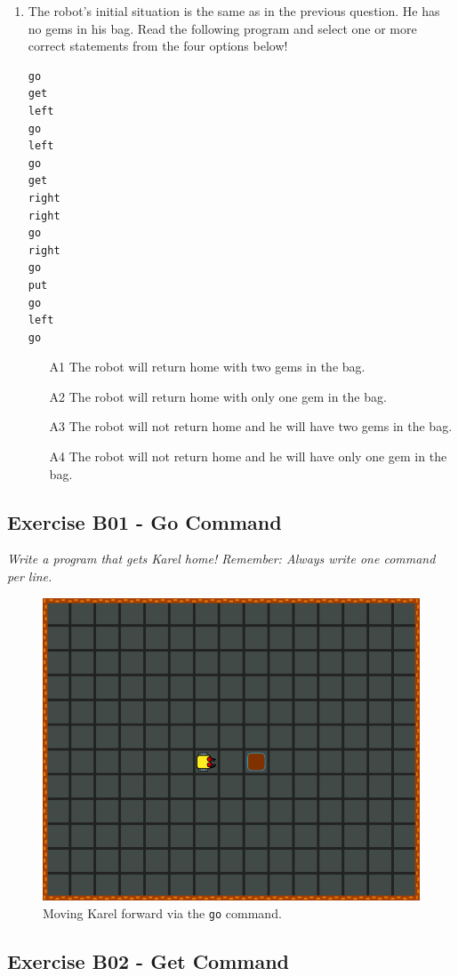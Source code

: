 \begin{enumerate}
\begin{enumerate}
\end{enumerate}
\item The robot's initial situation is the same as in the previous question. He has no gems 
in his bag. Read the following program and select one or more correct statements from the four options below!
\begin{verbatim}
go
get
left
go
left
go
get
right
right
go
right
go
put
go
left 
go
\end{verbatim}
\begin{enumerate}
\item[A1] The robot will return home with two gems in the bag.
\item[A2] The robot will return home with only one gem in the bag.
\item[A3] The robot will not return home and he will have two gems in the bag.
\item[A4] The robot will not return home and he will have only one gem in the bag.
\end{enumerate}
\end{enumerate}


\newpage
\subsection{Exercise B01 - Go Command}

{\em Write a program that gets Karel home! Remember: Always write one command per line.}

\begin{figure}[!ht]
\begin{center}
\includegraphics[height=0.4\textwidth]{imgk/b01.png}
\end{center}
\vspace{-4mm}
\caption{Moving Karel forward via the {\tt go} command.}
\label{fig:b01}
\vspace{-4mm}
\end{figure}
\noindent

\subsection{Exercise B02 - Get Command}

